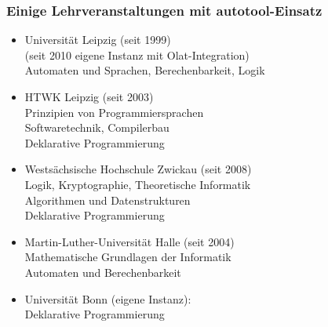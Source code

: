 \begin{frame}
  \frametitle{Einige Lehrveranstaltungen mit autotool-Einsatz}
  {\small
    \begin{itemize}
    \item Universität Leipzig (seit 1999) 
      \\ (seit 2010 eigene Instanz mit Olat-Integration)
      \\ Automaten und Sprachen, Berechenbarkeit, Logik
    \item HTWK Leipzig (seit 2003)
      \\ Prinzipien von Programmiersprachen
      \\ Softwaretechnik, Compilerbau
      \\ Deklarative Programmierung
    \item Westsächsische Hochschule Zwickau (seit 2008)
      \\ Logik, Kryptographie, Theoretische Informatik
      \\ Algorithmen und Datenstrukturen
      \\ Deklarative Programmierung
    \item Martin-Luther-Universität Halle (seit 2004)
      \\ Mathematische Grundlagen der Informatik 
      \\ Automaten und Berechenbarkeit
    \item Universität Bonn (eigene Instanz):
      \\ Deklarative Programmierung
    \end{itemize}
  }
\end{frame}
